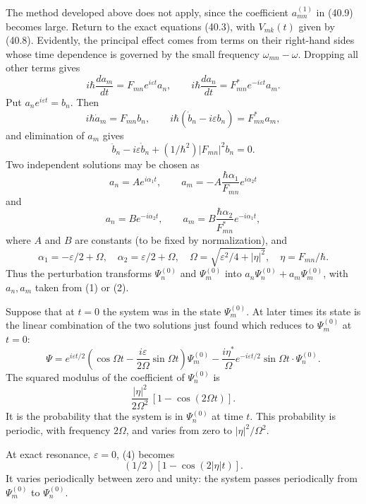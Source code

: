 \SolutionHeading The method developed above does not apply, since the
coefficient $a_{mn}^{(1)}$ in (40.9) becomes large. Return to the exact
equations (40.3), with $V_{mk}(t)$ given by (40.8). Evidently, the principal
effect comes from terms on their right-hand sides whose time dependence is
governed by the small frequency $\omega_{mn}-\omega$. Dropping all other
terms gives
\[
  i\hbar\frac{da_m}{dt}=F_{mn}e^{i\varepsilon t}a_n,
  \qquad
  i\hbar\frac{da_n}{dt}=F_{mn}^{*}e^{-i\varepsilon t}a_m.
\]
Put $a_ne^{i\varepsilon t}=b_n$. Then
\[
  i\hbar\dot a_m=F_{mn}b_n,
  \qquad
  i\hbar(\dot b_n-i\varepsilon b_n)=F_{mn}^{*}a_m,
\]
and elimination of $a_m$ gives
\[
  \ddot b_n-i\varepsilon\dot b_n+(1/\hbar^2)|F_{mn}|^2b_n=0.
\]
Two independent solutions may be chosen as
\begin{equation}
  a_n=Ae^{i\alpha_1t},\qquad
  a_m=-A\frac{\hbar\alpha_1}{F_{mn}}e^{i\alpha_2t}
  \tag{1}
\end{equation}
and
\begin{equation}
  a_n=Be^{-i\alpha_2t},\qquad
  a_m=B\frac{\hbar\alpha_2}{F_{mn}^{*}}e^{-i\alpha_1t},
  \tag{2}
\end{equation}
where $A$ and $B$ are constants (to be fixed by normalization), and
\[
  \alpha_1=-\varepsilon/2+\Omega,\quad
  \alpha_2=\varepsilon/2+\Omega,\quad
  \Omega=\sqrt{\varepsilon^2/4+|\eta|^2},\quad
  \eta=F_{mn}/\hbar.
\]
Thus the perturbation transforms $\Psi_n^{(0)}$ and $\Psi_m^{(0)}$ into
$a_n\Psi_n^{(0)}+a_m\Psi_m^{(0)}$, with $a_n,a_m$ taken from (1) or (2).

Suppose that at $t=0$ the system was in the state $\Psi_m^{(0)}$. At later
times its state is the linear combination of the two solutions just found
which reduces to $\Psi_m^{(0)}$ at $t=0$:
\begin{equation}
  \Psi=e^{i\varepsilon t/2}
  \left(\cos\Omega t-\frac{i\varepsilon}{2\Omega}\sin\Omega t\right)
  \Psi_m^{(0)}
  -\frac{i\eta^{*}}{\Omega}e^{-i\varepsilon t/2}\sin\Omega t\cdot
  \Psi_n^{(0)}.
  \tag{3}
\end{equation}
The squared modulus of the coefficient of $\Psi_n^{(0)}$ is
\begin{equation}
  \frac{|\eta|^2}{2\Omega^2}\,[1-\cos(2\Omega t)].
  \tag{4}
\end{equation}
It is the probability that the system is in $\Psi_n^{(0)}$ at time $t$.
This probability is periodic, with frequency $2\Omega$, and varies from zero
to $|\eta|^2/\Omega^2$.

At exact resonance, $\varepsilon=0$, (4) becomes
\[
  (1/2)[1-\cos(2|\eta|t)].
\]
It varies periodically between zero and unity: the system passes periodically
from $\Psi_m^{(0)}$ to $\Psi_n^{(0)}$.
